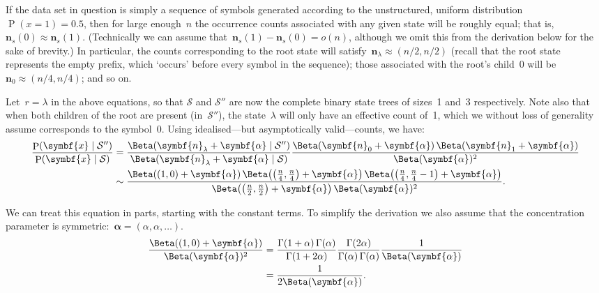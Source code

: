 \documentclass[11pt,a4paper]{article}
\newcommand\mc[1]{\mathcal{#1}}               %
\newcommand\ub[1]{\symbf{#1}}                 %
\DeclareMathOperator\Pb{P}                    %
\DeclarePairedDelimiter\lr{\lparen}{\rparen}  %
\newcommand\peq{\mathop{=}}              %
\begin{document}
If the data set in question is simply a sequence of symbols generated according
to the unstructured, uniform distribution~\(\Pb(x \peq 1) = 0.5\), then for
large enough~\(n\) the occurrence counts associated with any given state will be
roughly equal; that is, \(\ub{n}_s(0) \approx \ub{n}_s(1)\). (Technically we can
assume that~\(\ub{n}_s(1) - \ub{n}_s(0) = o(n)\), although we omit this from the
derivation below for the sake of brevity.) In particular, the counts
corresponding to the root state will satisfy~\(\ub{n}_{\lambda} \approx (n/2,
n/2)\) (recall that the root state represents the empty prefix, which `occurs'
before every symbol in the sequence); those associated with the root's child~0
will be~\(\ub{n}_0 \approx (n/4, n/4)\); and so on.

Let~\(r = \lambda\) in the above equations, so that \(\mc{S}\) and \(\mc{S}''\)
are now the complete binary state trees of sizes~1 and~3 respectively. Note also
that when both children of the root are present (in~\(\mc{S}''\)), the
state~\(\lambda\) will only have an effective count of~1, which we without loss
of generality assume corresponds to the symbol~0. Using idealised---but
asymptotically valid---counts, we have:
\begin{align}\label{eqn:bayes factor asymptotic}
  \frac{\Pb(\ub{x} \mid \mc{S}'')}{\Pb(\ub{x} \mid \mc{S})} &=
    \frac{\Beta(\ub{n}_{\lambda} + \ub{\alpha} \mid \mc{S}'')}
    {\Beta(\ub{n}_{\lambda} + \ub{\alpha} \mid \mc{S})}
    \frac{\Beta(\ub{n}_0 + \ub{\alpha})\, \Beta(\ub{n}_1 + \ub{\alpha})}
    {\Beta(\ub{\alpha})^2} \nonumber \\
  &\sim \frac{\Beta\lr*{\lr*{1, 0} + \ub{\alpha}}\,
    \Beta\lr*{\lr*{\frac{n}{4}, \frac{n}{4}} + \ub{\alpha}}\,
    \Beta\lr*{\lr*{\frac{n}{4}, \frac{n}{4}-1} + \ub{\alpha}}}
    {\Beta\lr*{\lr*{\frac{n}{2}, \frac{n}{2}} + \ub{\alpha}}\,
    \Beta(\ub{\alpha})^2}.
\end{align}

We can treat this equation in parts, starting with the constant terms. To
simplify the derivation we also assume that the concentration parameter is
symmetric:~\(\ub{\alpha} = (\alpha, \alpha, \dots)\).
\begin{align*}
  \frac{\Beta((1, 0) + \ub{\alpha})}{\Beta(\ub{\alpha})^2} &=
    \frac{\Gamma(1 + \alpha)\, \Gamma(\alpha)}{\Gamma(1 + 2\alpha)}
    \frac{\Gamma(2\alpha)}{\Gamma(\alpha)\, \Gamma(\alpha)}
    \frac{1}{\Beta(\ub{\alpha})} \\
  &= \frac{1}{2\Beta(\ub{\alpha})}.
\end{align*}
\end{document}

